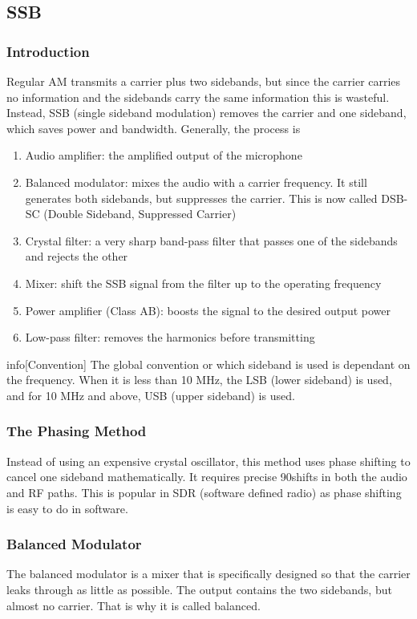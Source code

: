 \documentclass{article}
\begin{document}
\subsection{SSB}
\subsubsection{Introduction}
Regular AM transmits a carrier plus two sidebands, but since the carrier carries no information and the sidebands carry the same information this is wasteful. Instead, SSB (single sideband modulation) removes the carrier and one sideband, which saves power and bandwidth. Generally, the process is
\begin{enumerate}
    \item Audio amplifier: the amplified output of the microphone
    \item Balanced modulator: mixes the audio with a carrier frequency. It still generates both sidebands, but suppresses the carrier. This is now called DSB-SC (Double Sideband, Suppressed Carrier)
    \item Crystal filter: a very sharp band-pass filter that passes one of the sidebands and rejects the other
    \item Mixer: shift the SSB signal from the filter up to the operating frequency
    \item Power amplifier (Class AB): boosts the signal to the desired output power
    \item Low-pass filter: removes the harmonics before transmitting
\end{enumerate}

\begin{callout}{info}[Convention]
    The global convention or which sideband is used is dependant on the frequency. When it is less than 10 MHz, the LSB (lower sideband) is used, and for 10 MHz and above, USB (upper sideband) is used.
\end{callout}

\subsubsection{The Phasing Method}
Instead of using an expensive crystal oscillator, this method uses phase shifting to cancel one sideband mathematically. It requires precise 90\textdegree shifts in both the audio and RF paths. This is popular in SDR (software defined radio) as phase shifting is easy to do in software.

\subsubsection{Balanced Modulator}
The balanced modulator is a mixer that is specifically designed so that the carrier leaks through as little as possible. The output contains the two sidebands, but almost no carrier. That is why it is called balanced.
\end{document}
